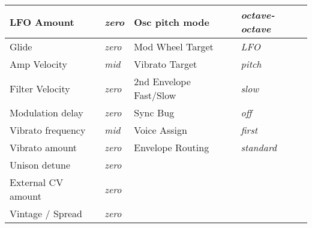 \begin{longtable}[l]{p{5cm}|p{5cm}|p{5cm}|p{5cm}|}
LFO Amount & \textit{zero} & Osc pitch mode & \textit{octave-octave} \\ \hline
Glide & \textit{zero} & Mod Wheel Target & \textit{LFO} \\ \hline
Amp Velocity & \textit{mid} & Vibrato Target & \textit{pitch} \\ \hline
Filter Velocity & \textit{zero} & 2nd Envelope Fast/Slow & \textit{slow} \\ \hline
Modulation delay & \textit{zero} & Sync Bug & \textit{off} \\ \hline
Vibrato frequency & \textit{mid} & Voice Assign & \textit{first} \\ \hline
Vibrato amount & \textit{zero} & Envelope Routing & \textit{standard} \\ \hline
Unison detune & \textit{zero} & &  \\ \hline
External CV amount & \textit{zero} &  &  \\ \hline
Vintage / Spread & \textit{zero} &  &  \\ \hline 
\end{longtable}
